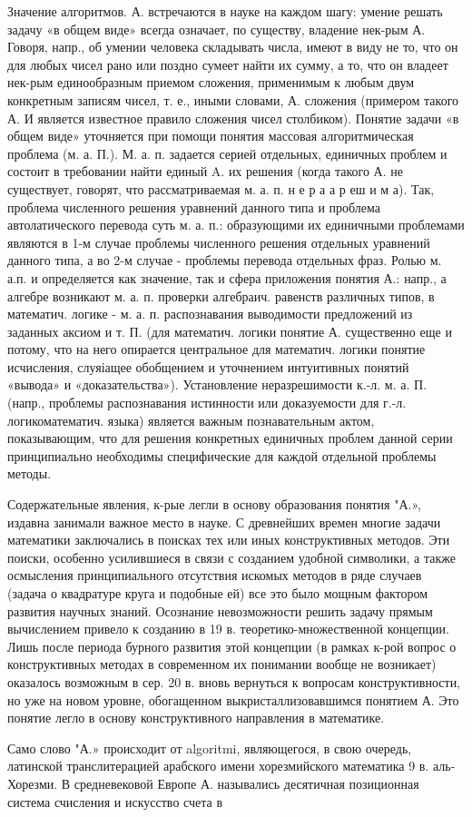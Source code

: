 \documentclass[10pt]{article}
\begin{document}
Значение алгоритмов. А. встречаются в науке на каждом шагу: умение решать задачу «в общем виде» всегда означает, по существу, владение нек-рым А. Говоря, напр., об умении человека складывать числа, имеют в виду не то, что он для любых чисел рано или поздно сумеет найти их сумму, а то, что он владеет нек-рым единообразным приемом сложения, применимым к любым двум конкретным записям чисел, т. е., иными словами, А. сложения (примером такого А. И является известное правило сложения чисел столбиком). Понятие задачи «в общем виде» уточняется при помощи понятия массовая алгоритмическая проблема (м. а. П.). М. а. п. задается серией отдельных, единичных проблем и состоит в требовании найти единый $\mathrm{A}$. их решения (когда такого А. не существует, говорят, что рассматриваемая м. а. п. н е р а $а$ р еш и м а). Так, проблема численного решения уравнений данного типа и проблема автолатического перевода суть м. а. п.: образующими их единичными проблемами являются в 1-м случае проблемы численного решения отдельных уравнений данного типа, а во 2-м случае - проблемы перевода отдельных фраз. Ролью м. а.п. и определяется как значение, так и сфера приложения понятия А.: напр., а алгебре возникают м. а. п. проверки алгебраич. равенств различных типов, в математич. логике - м. а. п. распознавания выводимости предложений из заданных аксиом и т. П. (для математич. логики понятие А. существенно еще и потому, что на него опирается центральное для математич. логики понятие исчисления, слуяіащее обобщением и уточнением интуитивных понятий «вывода» и «доказательства»). Установление неразрешимости к.-л. м. а. П. (напр., проблемы распознавания истинности или доказуемости для г.-л. логикоматематич. языка) является важным познавательным актом, показывающим, что для решения конкретных единичных проблем данной серии принципиально необходимы специфические для каждой отдельной проблемы методы.



Содержательные явления, к-рые легли в основу образования понятия "А.», издавна занимали важное место в науке. С древнейших времен многие задачи математики заключались в поисках тех или иных конструктивных методов. Эти поиски, особенно усилившиеся в связи с созданием удобной символики, а также осмысления принципиального отсутствия искомых методов в ряде случаев (задача о квадратуре круга и подобные ей) все это было мощным фактором развития научных знаний. Осознание невозможности решить задачу прямым вычислением привело к созданию в 19 в. теоретико-множественной концепции. Лишь после периода бурного развития этой концепции (в рамках к-рой вопрос о конструктивных методах в современном их понимании вообще не возникает) оказалось возможным в сер. 20 в. вновь вернуться к вопросам конструктивности, но уже на новом уровне, обогащенном выкристаллизовавшимся понятием А. Это понятие легло в основу конструктивного направления в математике.



Само слово "А.» происходит от algoritmi, являющегося, в свою очередь, латинской транслитерацией арабского имени хорезмийского математика 9 в. аль-Хорезми. В средневековой Европе А. назывались десятичная позиционная система счисления и искусство счета в
\end{document}
